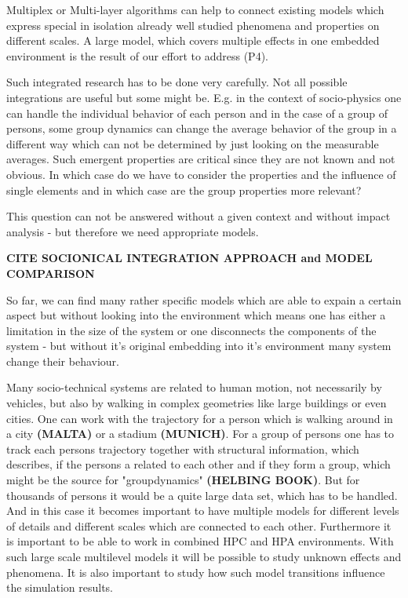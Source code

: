 \documentclass[a4paper,10pt]{scrbook}
\begin{document}
Multiplex or Multi-layer algorithms can help to connect existing models which express special in isolation already well studied phenomena and properties on different 
scales. A large model, which covers multiple effects in one embedded environment is the result of our effort to address (P4). 

Such integrated research has to be done very carefully. Not all possible integrations are useful but some might be. E.g. in the context of socio-physics one can handle the individual behavior of each person and in the case of a group of persons, some group dynamics can change the average behavior of the group
in a different way which can not be determined by just looking on the measurable averages. Such emergent properties are critical since they are not known and not obvious. In which case do we have to consider
the properties and the influence of single elements and in which case are the group properties more relevant? 

This question can 
not be answered without a given context and without impact analysis - but therefore we need appropriate models.

\textbf{CITE SOCIONICAL INTEGRATION APPROACH and MODEL COMPARISON}

So far, we can find many rather specific models which are able to expain a certain aspect but without 
looking into the environment which means one has either a limitation in the size of the system or one disconnects the components of the system - but without it's original embedding into it's environment many system change their behaviour.  

Many socio-technical systems are related to human motion, not necessarily by vehicles, but also by walking in complex geometries like large buildings or even cities. One can work with the trajectory for a person which is walking around in a city \textbf{(MALTA)} or a stadium \textbf{(MUNICH)}. For a group of persons
one has to track each persons trajectory together with structural information, which describes, if the persons a related to each other
and if they form a group, which might be the source for "groupdynamics"\textbf{ (HELBING BOOK)}. But for thousands of persons it would be a quite large data set, which
has to be handled. And in this case it becomes important to have multiple models for different levels of details and different scales which are connected to each other. Furthermore it is important to be able to work in combined HPC and HPA environments.
With such large scale multilevel models it will be possible to study unknown effects and phenomena. It is also important to study how such model transitions influence the simulation results.
\end{document}
